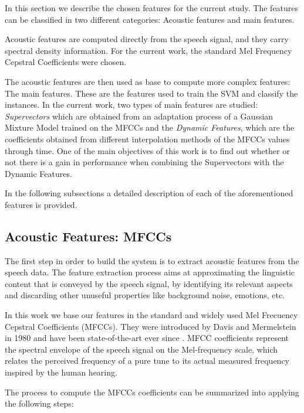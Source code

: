 In this section we describe the chosen features for the current study. The features can be classified in two different categories: Acoustic features and main features.

Acoustic features are computed directly from the speech signal, and they carry spectral density information. For the current work, the standard Mel Frequency Cepstral Coefficients
were chosen.

The acoustic features are then used as base to compute more complex features:
The main features. These
are the features used to train the SVM and classify the instances. In the current work, two
types of main features are studied: \textit{Supervectors}
which are obtained from an adaptation process of
a Gaussian Mixture Model trained on the MFCCs and the \textit{Dynamic Features},
which are
the coefficients obtained from different interpolation methods of the MFCCs values through time.
One of the main objectives of this work is to find out whether or not there is a gain in performance
when combining the Supervectors with the Dynamic Features.

In the following subsections a detailed description of each of the aforementioned features is
provided.

\subsection{Acoustic Features: MFCCs}

The first step in order to build the system is to extract acoustic features from the speech data.
The feature extraction process aims at approximating the linguistic content that is conveyed
by the speech signal, by identifying its relevant aspects and discarding other unuseful
properties like background noise, emotions, etc.

In this work we base our features in the standard and widely used Mel Frecuency
Cepstral Coefficients (MFCCs). They were introduced by Davis and Mermelstein in 1980 and
have been state-of-the-art ever since \cite{mfcc_foundational}.
MFCC coefficients represent the spectral envelope of the speech signal on the Mel-frequency scale,
which relates the perceived frequency of a pure tune to its actual measured frequency inspired
by the human hearing.

The process to compute the MFCCs coefficients can be summarized into applying the following steps:

